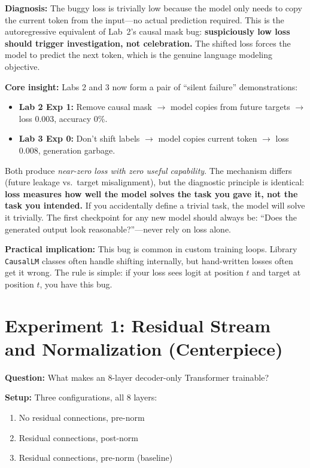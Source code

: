 \textbf{Diagnosis:} The buggy loss is trivially low because the model only needs to copy the current token from the input---no actual prediction required. This is the autoregressive equivalent of Lab~2's causal mask bug: \textbf{suspiciously low loss should trigger investigation, not celebration.} The shifted loss forces the model to predict the next token, which is the genuine language modeling objective.

\textbf{Core insight:} Labs 2 and 3 now form a pair of ``silent failure'' demonstrations:
\begin{itemize}
\item \textbf{Lab 2 Exp 1:} Remove causal mask $\to$ model copies from future targets $\to$ loss 0.003, accuracy 0\%.
\item \textbf{Lab 3 Exp 0:} Don't shift labels $\to$ model copies current token $\to$ loss 0.008, generation garbage.
\end{itemize}
Both produce \emph{near-zero loss with zero useful capability}. The mechanism differs (future leakage vs.\ target misalignment), but the diagnostic principle is identical: \textbf{loss measures how well the model solves the task you gave it, not the task you intended.} If you accidentally define a trivial task, the model will solve it trivially. The first checkpoint for any new model should always be: ``Does the generated output look reasonable?''---never rely on loss alone.

\textbf{Practical implication:} This bug is common in custom training loops. Library \texttt{CausalLM} classes often handle shifting internally, but hand-written losses often get it wrong. The rule is simple: if your loss sees logit at position $t$ and target at position $t$, you have this bug.

\section{Experiment 1: Residual Stream and Normalization (Centerpiece)}

\textbf{Question:} What makes an 8-layer decoder-only Transformer trainable?

\textbf{Setup:} Three configurations, all 8 layers:
\begin{enumerate}[label=(\Alph*)]
\item No residual connections, pre-norm
\item Residual connections, post-norm
\item Residual connections, pre-norm (baseline)
\end{enumerate}

